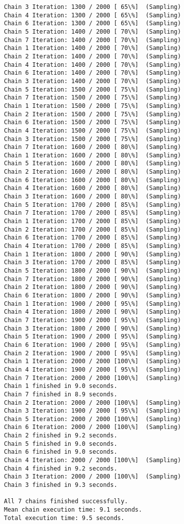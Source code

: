 \documentclass[11pt]{article}
\begin{document}
\begin{Verbatim}[commandchars=\\\{\}]
Chain 3 Iteration: 1300 / 2000 [ 65\%]  (Sampling)
Chain 4 Iteration: 1300 / 2000 [ 65\%]  (Sampling)
Chain 6 Iteration: 1300 / 2000 [ 65\%]  (Sampling)
Chain 5 Iteration: 1400 / 2000 [ 70\%]  (Sampling)
Chain 7 Iteration: 1400 / 2000 [ 70\%]  (Sampling)
Chain 1 Iteration: 1400 / 2000 [ 70\%]  (Sampling)
Chain 2 Iteration: 1400 / 2000 [ 70\%]  (Sampling)
Chain 4 Iteration: 1400 / 2000 [ 70\%]  (Sampling)
Chain 6 Iteration: 1400 / 2000 [ 70\%]  (Sampling)
Chain 3 Iteration: 1400 / 2000 [ 70\%]  (Sampling)
Chain 5 Iteration: 1500 / 2000 [ 75\%]  (Sampling)
Chain 7 Iteration: 1500 / 2000 [ 75\%]  (Sampling)
Chain 1 Iteration: 1500 / 2000 [ 75\%]  (Sampling)
Chain 2 Iteration: 1500 / 2000 [ 75\%]  (Sampling)
Chain 6 Iteration: 1500 / 2000 [ 75\%]  (Sampling)
Chain 4 Iteration: 1500 / 2000 [ 75\%]  (Sampling)
Chain 3 Iteration: 1500 / 2000 [ 75\%]  (Sampling)
Chain 7 Iteration: 1600 / 2000 [ 80\%]  (Sampling)
Chain 1 Iteration: 1600 / 2000 [ 80\%]  (Sampling)
Chain 5 Iteration: 1600 / 2000 [ 80\%]  (Sampling)
Chain 2 Iteration: 1600 / 2000 [ 80\%]  (Sampling)
Chain 6 Iteration: 1600 / 2000 [ 80\%]  (Sampling)
Chain 4 Iteration: 1600 / 2000 [ 80\%]  (Sampling)
Chain 3 Iteration: 1600 / 2000 [ 80\%]  (Sampling)
Chain 5 Iteration: 1700 / 2000 [ 85\%]  (Sampling)
Chain 7 Iteration: 1700 / 2000 [ 85\%]  (Sampling)
Chain 1 Iteration: 1700 / 2000 [ 85\%]  (Sampling)
Chain 2 Iteration: 1700 / 2000 [ 85\%]  (Sampling)
Chain 6 Iteration: 1700 / 2000 [ 85\%]  (Sampling)
Chain 4 Iteration: 1700 / 2000 [ 85\%]  (Sampling)
Chain 1 Iteration: 1800 / 2000 [ 90\%]  (Sampling)
Chain 3 Iteration: 1700 / 2000 [ 85\%]  (Sampling)
Chain 5 Iteration: 1800 / 2000 [ 90\%]  (Sampling)
Chain 7 Iteration: 1800 / 2000 [ 90\%]  (Sampling)
Chain 2 Iteration: 1800 / 2000 [ 90\%]  (Sampling)
Chain 6 Iteration: 1800 / 2000 [ 90\%]  (Sampling)
Chain 1 Iteration: 1900 / 2000 [ 95\%]  (Sampling)
Chain 4 Iteration: 1800 / 2000 [ 90\%]  (Sampling)
Chain 7 Iteration: 1900 / 2000 [ 95\%]  (Sampling)
Chain 3 Iteration: 1800 / 2000 [ 90\%]  (Sampling)
Chain 5 Iteration: 1900 / 2000 [ 95\%]  (Sampling)
Chain 6 Iteration: 1900 / 2000 [ 95\%]  (Sampling)
Chain 2 Iteration: 1900 / 2000 [ 95\%]  (Sampling)
Chain 1 Iteration: 2000 / 2000 [100\%]  (Sampling)
Chain 4 Iteration: 1900 / 2000 [ 95\%]  (Sampling)
Chain 7 Iteration: 2000 / 2000 [100\%]  (Sampling)
Chain 1 finished in 9.0 seconds.
Chain 7 finished in 8.9 seconds.
Chain 2 Iteration: 2000 / 2000 [100\%]  (Sampling)
Chain 3 Iteration: 1900 / 2000 [ 95\%]  (Sampling)
Chain 5 Iteration: 2000 / 2000 [100\%]  (Sampling)
Chain 6 Iteration: 2000 / 2000 [100\%]  (Sampling)
Chain 2 finished in 9.2 seconds.
Chain 5 finished in 9.0 seconds.
Chain 6 finished in 9.0 seconds.
Chain 4 Iteration: 2000 / 2000 [100\%]  (Sampling)
Chain 4 finished in 9.2 seconds.
Chain 3 Iteration: 2000 / 2000 [100\%]  (Sampling)
Chain 3 finished in 9.3 seconds.

All 7 chains finished successfully.
Mean chain execution time: 9.1 seconds.
Total execution time: 9.5 seconds.

    \end{Verbatim}
\end{document}
